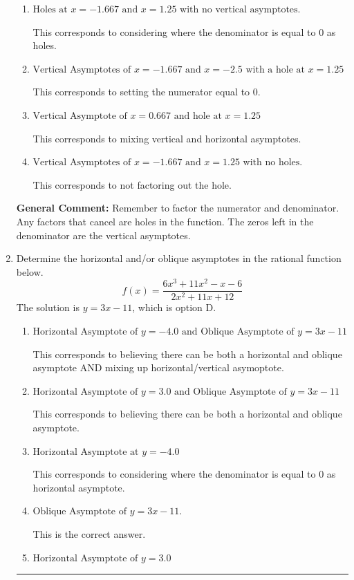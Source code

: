 \documentclass{extbook}[14pt]
\newcommand{\litem}[1]{\item #1

\rule{\textwidth}{0.4pt}}
\begin{document}
\begin{enumerate}
{\begin{enumerate}[label=\Alph*.]
This is the correct answer.
\item \( \text{Holes at } x = -1.667 \text{ and } x = 1.25 \text{ with no vertical asymptotes.} \)

This corresponds to considering where the denominator is equal to 0 as holes.
\item \( \text{Vertical Asymptotes of } x = -1.667 \text{ and } x = -2.5 \text{ with a hole at } x = 1.25 \)

This corresponds to setting the numerator equal to 0.
\item \( \text{Vertical Asymptote of } x = 0.667 \text{ and hole at } x = 1.25 \)

This corresponds to mixing vertical and horizontal asymptotes.
\item \( \text{Vertical Asymptotes of } x = -1.667 \text{ and } x = 1.25 \text{ with no holes.} \)

This corresponds to not factoring out the hole.
\end{enumerate}

\textbf{General Comment:} Remember to factor the numerator and denominator. Any factors that cancel are holes in the function. The zeros left in the denominator are the vertical asymptotes.
}
\litem{
Determine the horizontal and/or oblique asymptotes in the rational function below.
\[ f(x) = \frac{6x^{3} +11 x^{2} -x -6}{2x^{2} +11 x + 12} \]The solution is \( y = 3x -11 \), which is option D.\begin{enumerate}[label=\Alph*.]
\item \( \text{Horizontal Asymptote of } y = -4.0 \text{ and Oblique Asymptote of } y = 3x -11 \)

This corresponds to believing there can be both a horizontal and oblique asymptote AND mixing up horizontal/vertical asymoptote.
\item \( \text{Horizontal Asymptote of } y = 3.0 \text{ and Oblique Asymptote of } y = 3x -11 \)

This corresponds to believing there can be both a horizontal and oblique asymptote.
\item \( \text{Horizontal Asymptote at } y = -4.0 \)

This corresponds to considering where the denominator is equal to 0 as horizontal asymptote.
\item \( \text{Oblique Asymptote of } y = 3x -11. \)

This is the correct answer.
\item \( \text{Horizontal Asymptote of } y = 3.0  \)


\end{enumerate}}
\end{enumerate}
\end{document}
